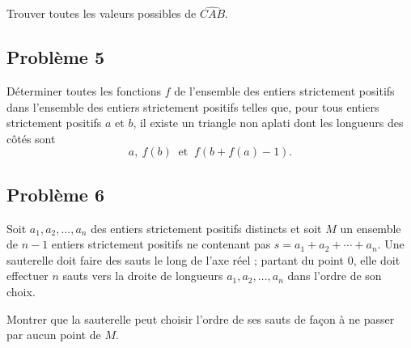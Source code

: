 Trouver toutes les valeurs possibles de $\widehat{CAB}$.

\subsection*{Problème 5}
Déterminer toutes les fonctions $f$ de l'ensemble des entiers strictement positifs dans l'ensemble des
entiers strictement positifs telles que, pour tous entiers strictement positifs $a$ et $b$, il existe un
triangle non aplati dont les longueurs des côtés sont
\[
a, \ f(b) \ \text{ et } \ f(b + f(a) - 1).
\]

\subsection*{Problème 6}
Soit $a_1, a_2, \ldots, a_n$ des entiers strictement positifs distincts et soit $M$ un ensemble de $n - 1$
entiers strictement positifs ne contenant pas $s = a_1 + a_2 + \cdots + a_n$. Une sauterelle doit faire des
sauts le long de l'axe réel ; partant du point $0$, elle doit effectuer $n$ sauts vers la droite de longueurs
$a_1, a_2, \ldots, a_n$ dans l'ordre de son choix.

Montrer que la sauterelle peut choisir l'ordre de ses sauts de façon à ne passer par aucun point de $M$.
